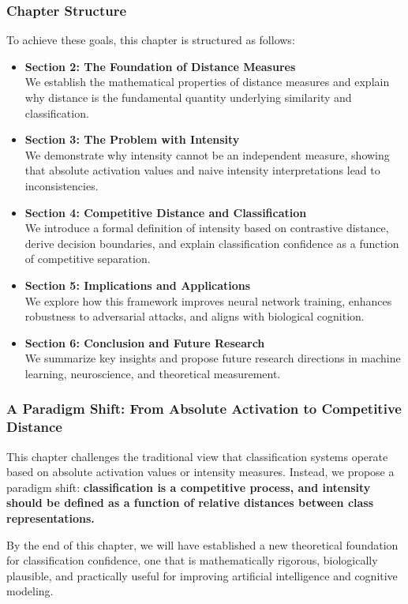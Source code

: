 \subsubsection{Chapter Structure}

To achieve these goals, this chapter is structured as follows:

\begin{itemize}
    \item \textbf{Section 2: The Foundation of Distance Measures} \\
    We establish the mathematical properties of distance measures and explain why distance is the fundamental quantity underlying similarity and classification.
    \item \textbf{Section 3: The Problem with Intensity} \\
    We demonstrate why intensity cannot be an independent measure, showing that absolute activation values and naive intensity interpretations lead to inconsistencies.
    \item \textbf{Section 4: Competitive Distance and Classification} \\
    We introduce a formal definition of intensity based on contrastive distance, derive decision boundaries, and explain classification confidence as a function of competitive separation.
    \item \textbf{Section 5: Implications and Applications} \\
    We explore how this framework improves neural network training, enhances robustness to adversarial attacks, and aligns with biological cognition.
    \item \textbf{Section 6: Conclusion and Future Research} \\
    We summarize key insights and propose future research directions in machine learning, neuroscience, and theoretical measurement.
\end{itemize}

\subsubsection{A Paradigm Shift: From Absolute Activation to Competitive Distance}

This chapter challenges the traditional view that classification systems operate based on absolute activation values or intensity measures. Instead, we propose a paradigm shift: \textbf{classification is a competitive process, and intensity should be defined as a function of relative distances between class representations.}

By the end of this chapter, we will have established a new theoretical foundation for classification confidence, one that is mathematically rigorous, biologically plausible, and practically useful for improving artificial intelligence and cognitive modeling.
